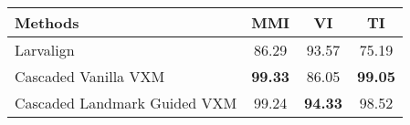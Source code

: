 \begin{tabular}{lccc}
\hline
 ﻿Methods  & MMI   & VI    & TI    \\ \hline \hline
 Larvalign & 86.29 & 93.57 & 75.19 \\
 Cascaded Vanilla VXM  & \textbf{99.33} & 86.05 & \textbf{99.05} \\
 Cascaded Landmark Guided VXM  & 99.24 & \textbf{94.33} & 98.52 \\
\hline
\end{tabular}